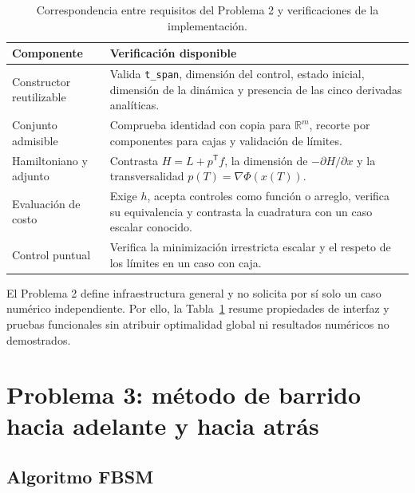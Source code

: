 \documentclass[11pt,a4paper]{article}
\begin{document}
\begin{table}[htbp]
    \centering
    \caption{Correspondencia entre requisitos del Problema 2 y verificaciones de la implementación.}
    \label{tab:control-problem}
    \small
    \begin{tabular}{>{\raggedright\arraybackslash}p{} >{\raggedright\arraybackslash}p{}}
        \toprule
        Componente & Verificación disponible \\
        \midrule
        Constructor reutilizable & Valida \texttt{t\_span}, dimensión del control, estado inicial, dimensión de la dinámica y presencia de las cinco derivadas analíticas. \\
        Conjunto admisible & Comprueba identidad con copia para $\mathbb{R}^m$, recorte por componentes para cajas y validación de límites. \\
        Hamiltoniano y adjunto & Contrasta $H=L+p^{\mathsf T}f$, la dimensión de $-\partial H/\partial x$ y la transversalidad $p(T)=\nabla\Phi(x(T))$. \\
        Evaluación de costo & Exige $h$, acepta controles como función o arreglo, verifica su equivalencia y contrasta la cuadratura con un caso escalar conocido. \\
        Control puntual & Verifica la minimización irrestricta escalar y el respeto de los límites en un caso con caja. \\
        \bottomrule
    \end{tabular}
\end{table}

El Problema 2 define infraestructura general y no solicita por sí solo un caso numérico independiente. Por ello, la Tabla~\ref{tab:control-problem} resume propiedades de interfaz y pruebas funcionales sin atribuir optimalidad global ni resultados numéricos no demostrados.

\clearpage
\section{Problema 3: método de barrido hacia adelante y hacia atrás}

\subsection{Algoritmo FBSM}
\end{document}
